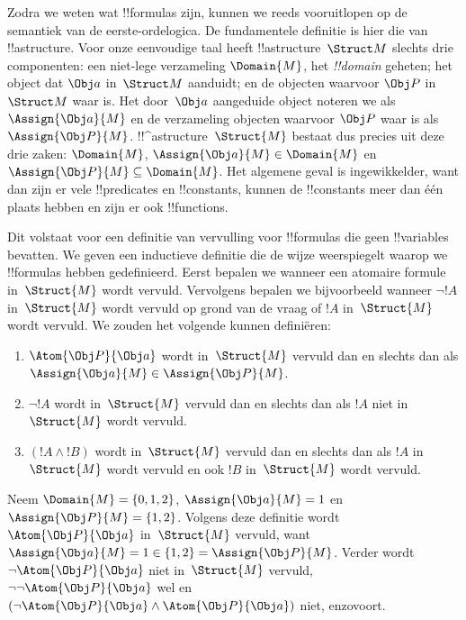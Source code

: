 \documentclass[openany]{memoir}
\begin{document}


Zodra we weten wat !!{formula}s zijn, kunnen we reeds vooruitlopen op
de semantiek van de eerste-ordelogica. De fundamentele definitie is
hier die van !!a{structure}. Voor onze eenvoudige taal heeft
!!a{structure}~$\Struct M$ slechts drie componenten: een niet-lege
verzameling $\Domain{M}$, het \emph{!!{domain}} geheten; het object dat
$\Obj a$ in~$\Struct M$ aanduidt; en de objecten waarvoor $\Obj P$ in
$\Struct M$ waar is. Het door~$\Obj a$ aangeduide object noteren we als
$\Assign{\Obj a}{M}$ en de verzameling objecten waarvoor $\Obj P$ waar
is als~$\Assign{\Obj P}{M}$. !!^a{structure}~$\Struct{M}$ bestaat dus
precies uit deze drie zaken: $\Domain{M}$,
$\Assign{\Obj a}{M} \in \Domain{M}$ en
$\Assign{\Obj P}{M} \subseteq \Domain{M}$. Het algemene geval is
ingewikkelder, want dan zijn er vele !!{predicate}s en !!{constant}s,
kunnen de !!{constant}s meer dan één plaats hebben en zijn er ook
!!{function}s.

Dit volstaat voor een definitie van vervulling voor !!{formula}s die
geen !!{variable}s bevatten. We geven een inductieve definitie die de
wijze weerspiegelt waarop we !!{formula}s hebben gedefinieerd. Eerst
bepalen we wanneer een atomaire formule in~$\Struct{M}$ wordt vervuld.
Vervolgens bepalen we bijvoorbeeld wanneer $\lnot !A$ in~$\Struct{M}$
wordt vervuld op grond van de vraag of $!A$ in~$\Struct{M}$ wordt
vervuld. We zouden het volgende kunnen definiëren:
\begin{enumerate}
  \item $\Atom{\Obj P}{\Obj a}$ wordt in~$\Struct{M}$ vervuld dan en slechts dan als
  $\Assign{\Obj a}{M} \in \Assign{\Obj P}{M}$.
  \item $\lnot !A$ wordt in~$\Struct{M}$ vervuld dan en slechts dan als $!A$ niet
  in~$\Struct{M}$ wordt vervuld.
  \item $(!A \land !B)$ wordt in~$\Struct{M}$ vervuld dan en slechts dan als $!A$
  in~$\Struct{M}$ wordt vervuld en ook $!B$ in~$\Struct{M}$ wordt vervuld.
\end{enumerate}
Neem $\Domain{M} = \{0, 1, 2\}$, $\Assign{\Obj a}{M} = 1$ en
$\Assign{\Obj P}{M} = \{1, 2\}$. Volgens deze definitie wordt
$\Atom{\Obj P}{\Obj a}$ in~$\Struct{M}$ vervuld, want
$\Assign{\Obj a}{M} =  1 \in \{1,2\} = \Assign{\Obj P}{M}$. Verder
wordt $\lnot \Atom{\Obj P}{\Obj a}$ niet in~$\Struct{M}$ vervuld,
$\lnot\lnot \Atom{\Obj P}{\Obj a}$ wel en
$(\lnot \Atom{\Obj P}{\Obj a} \land \Atom{\Obj P}{\Obj a})$ niet,
enzovoort.
\end{document}
